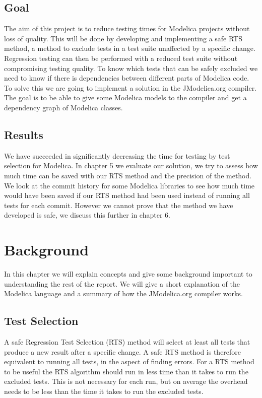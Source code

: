 \documentclass{cslthse-msc}
\begin{document}
\section{Goal}
The aim of this project is to reduce testing times for Modelica projects without loss of quality. This will be done by developing and implementing a safe RTS method, a method to exclude tests in a test suite unaffected by a specific change. \cite{DBLP:conf/pppj/OqvistHM16} Regression testing can then be performed with a reduced test suite without compromising testing quality. To know which tests that can be safely excluded we need to know if there is dependencies between different parts of Modelica code. To solve this we are going to implement a solution in the JModelica.org compiler. The goal is to be able to give some Modelica models to the compiler and get a dependency graph of Modelica classes.

\section{Results}
We have succeeded in significantly decreasing the time for testing by test selection for Modelica. In chapter 5 we evaluate our solution, we try to assess how much time can be saved with our RTS method and the precision of the method. We look at the commit history for some Modelica libraries to see how much time would have been saved if our RTS method had been used instead of running all tests for each commit. However we cannot prove that the method we have developed is safe, we discuss this further in chapter 6.

\chapter[Background]{Background}
In this chapter we will explain concepts and give some background important to understanding the rest of the report. We will give a short explanation of the Modelica language and a summary of how the JModelica.org compiler works.

\section{Test Selection}
A safe Regression Test Selection (RTS) method will select at least all tests that produce a new result after a specific change. \cite{DBLP:conf/pppj/OqvistHM16} A safe RTS method is therefore equivalent to running all tests, in the aspect of finding errors. For a RTS method to be useful the RTS algorithm should run in less time than it takes to run the excluded tests. This is not necessary for each run, but on average the overhead needs to be less than the time it takes to run the excluded tests.
\end{document}
